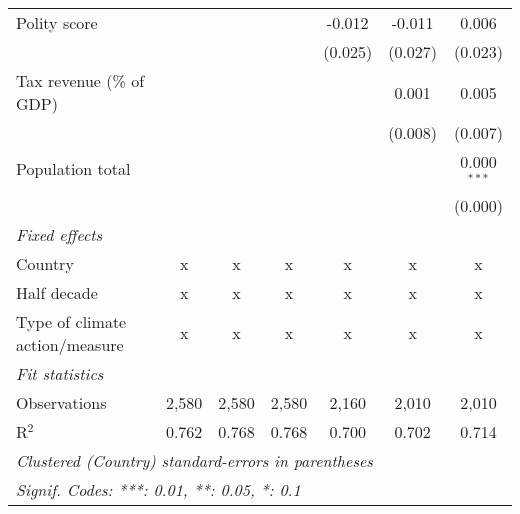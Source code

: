 \begin{tabular}{lcccccc}
   Polity score                                                             &         &               &               & -0.012        & -0.011        & 0.006\\   
                                                                            &         &               &               & (0.025)       & (0.027)       & (0.023)\\   
   Tax revenue (\% of GDP)                                                  &         &               &               &               & 0.001         & 0.005\\   
                                                                            &         &               &               &               & (0.008)       & (0.007)\\   
   Population total                                                         &         &               &               &               &               & 0.000$^{***}$\\   
                                                                            &         &               &               &               &               & (0.000)\\   
   \emph{Fixed effects}\\
   Country                                                                  & x       & x             & x             & x             & x             & x\\  
   Half decade                                                              & x       & x             & x             & x             & x             & x\\  
   Type of climate action/measure                                           & x       & x             & x             & x             & x             & x\\  
   \midrule \emph{Fit statistics}\\
   Observations                                                             & 2,580   & 2,580         & 2,580         & 2,160         & 2,010         & 2,010\\  
   R$^2$                                                                    & 0.762   & 0.768         & 0.768         & 0.700         & 0.702         & 0.714\\  
   \midrule
   \multicolumn{7}{l}{\emph{Clustered (Country) standard-errors in parentheses}}\\
   \multicolumn{7}{l}{\emph{Signif. Codes: ***: 0.01, **: 0.05, *: 0.1}}\\
\end{tabular}
\par\endgroup



